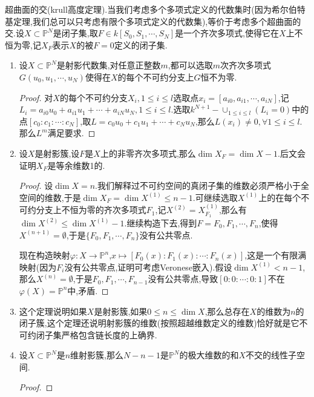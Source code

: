 超曲面的交(krull高度定理).当我们考虑多个多项式定义的代数集时(因为希尔伯特基定理,我们总可以只考虑有限个多项式定义的代数集),等价于考虑多个超曲面的交.设$X\subset\mathbb{P}^N$是闭子集,取$F\in k[S_0,S_1,\cdots,S_N]$是一个齐次多项式,使得它在$X$上不恒为零,记$X_F$表示$X$的被$F=0$定义的闭子集.
\begin{enumerate}
	\item 设$X\subset\mathbb{P}^N$是射影代数集,对任意正整数$m$,都可以选取$m$次齐次多项式$G(u_0,u_1,\cdots,u_N)$使得在$X$的每个不可约分支上$G$恒不为零.
	\begin{proof}
		
		对$X$的每个不可约分支$X_i,1\le i\le l$选取点$x_i=[a_{i0},a_{i1},\cdots,a_{iN}]$,记$L_i=a_{i0}u_0+a_{i1}u_1+\cdots+a_{iN}u_N,1\le i\le l$.选取$k^{N+1}-\cup_{1\le i\le l}(L_i=0)$中的点$[c_0:c_1:\cdots:c_N]$,取$L=c_0u_0+c_1u_1+\cdots+c_Nu_N$,那么$L(x_i)\not=0,\forall 1\le i\le l$.那么$L^m$满足要求.
	\end{proof}
	\item 设$X$是射影簇,设$F$是$X$上的非零齐次多项式,那么$\dim X_F=\dim X-1$.后文会证明$X_F$是等余维数1的.
	\begin{proof}
		
		设$\dim X=n$.我们解释过不可约空间的真闭子集的维数必须严格小于全空间的维数,于是$\dim X_F=\dim X^{(1)}\le n-1$.可继续选取$X^{(1)}$上的在每个不可约分支上不恒为零的齐次多项式$F_1$,记$X^{(2)}=X^{(1)}_{F_1}$,那么有$\dim X^{(2)}\le\dim X^{(1)}-1$.继续构造下去,得到$F=F_0,F_1,\cdots,F_n$,使得$X^{(n+1)}=\emptyset$,于是$\{F_0,F_1,\cdots,F_n\}$没有公共零点.
		
		\qquad
		
		现在构造映射$\varphi:X\to\mathbb{P}^n$,$x\mapsto[F_0(x):F_1(x):\cdots:F_n(x)]$,这是一个有限满映射(因为$F_i$没有公共零点,证明可考虑Veronese嵌入).假设$\dim X^{(1)}<n-1$,那么$X^{(n)}=\emptyset$,于是$F_0,F_1,\cdots,F_{n-1}$没有公共零点,导致$[0:0:\cdots:0:1]$不在$\varphi(X)=\mathbb{P}^n$中,矛盾.
	\end{proof}
	\item 这个定理说明如果$X$是射影簇,如果$0\le n\le\dim X$,那么总存在$X$的维数为$n$的闭子簇,这个定理还说明射影簇的维数(按照超越维数定义的维数)恰好就是它不可约闭子集严格包含链长度的上确界.
	\item 设$X\subset\mathbb{P}^N$是$n$维射影簇,那么$N-n-1$是$\mathbb{P}^N$的极大维数的和$X$不交的线性子空间.
	\begin{proof}
		

\end{proof}
\end{enumerate}
